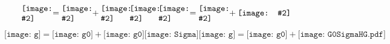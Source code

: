 \documentclass{these}
\newcommand{\diagscale}[2]{%
\begin{minipage}[c]{#1}
\texttt{[image: \#2]}
\end{minipage}}
\newcommand{\diagscaleb}[2]{%
\texttt{[image: \#2]}
}
\begin{document}
\[
\diagscale{1.2cm}{g} = \diagscale{1.2cm}{g0} + \diagscale{1.2cm}{g0}
\diagscale{1.2cm}{Sigma} \diagscale{1.2cm}{g} = \diagscale{1.2cm}{g0}
+ \diagscaleb{3.6cm}{G0SigmaHG.pdf}
\]


\[
\texttt{[image: g]} = \texttt{[image: g0]}
+ \texttt{[image: g0]}
\texttt{[image: Sigma]} \texttt{[image: g]}
= \texttt{[image: g0]}
+ \texttt{[image: G0SigmaHG.pdf]}
\]
\end{document}
